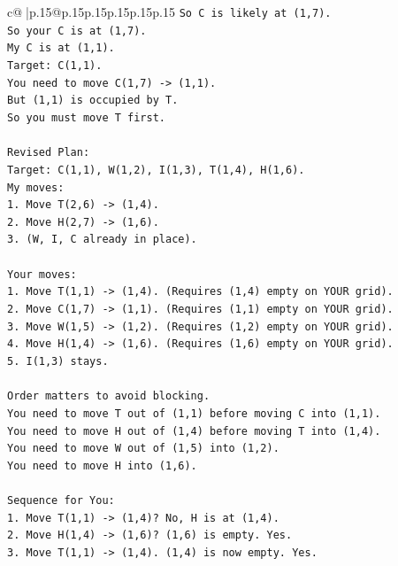\documentclass{article}
\begin{document}
{\begin{supertabular}{c@{$\;$}|p{.15\linewidth}@{}p{.15\linewidth}p{.15\linewidth}p{.15\linewidth}p{.15\linewidth}p{.15\linewidth}}
{{{\texttt{So C is likely at (1,7).} \\
\texttt{So your C is at (1,7).} \\
\texttt{My C is at (1,1).} \\
\texttt{Target: C(1,1).} \\
\texttt{You need to move C(1,7) {-}> (1,1).} \\
\texttt{But (1,1) is occupied by T.} \\
\texttt{So you must move T first.} \\
\\ 
\texttt{Revised Plan:} \\
\texttt{Target: C(1,1), W(1,2), I(1,3), T(1,4), H(1,6).} \\
\texttt{My moves:} \\
\texttt{1. Move T(2,6) {-}> (1,4).} \\
\texttt{2. Move H(2,7) {-}> (1,6).} \\
\texttt{3. (W, I, C already in place).} \\
\\ 
\texttt{Your moves:} \\
\texttt{1. Move T(1,1) {-}> (1,4). (Requires (1,4) empty on YOUR grid).} \\
\texttt{2. Move C(1,7) {-}> (1,1). (Requires (1,1) empty on YOUR grid).} \\
\texttt{3. Move W(1,5) {-}> (1,2). (Requires (1,2) empty on YOUR grid).} \\
\texttt{4. Move H(1,4) {-}> (1,6). (Requires (1,6) empty on YOUR grid).} \\
\texttt{5. I(1,3) stays.} \\
\\ 
\texttt{Order matters to avoid blocking.} \\
\texttt{You need to move T out of (1,1) before moving C into (1,1).} \\
\texttt{You need to move H out of (1,4) before moving T into (1,4).} \\
\texttt{You need to move W out of (1,5) into (1,2).} \\
\texttt{You need to move H into (1,6).} \\
\\ 
\texttt{Sequence for You:} \\
\texttt{1. Move T(1,1) {-}> (1,4)? No, H is at (1,4).} \\
\texttt{2. Move H(1,4) {-}> (1,6)? (1,6) is empty. Yes.} \\
\texttt{3. Move T(1,1) {-}> (1,4). (1,4) is now empty. Yes.} \\
}}}
\end{supertabular}}
\end{document}
